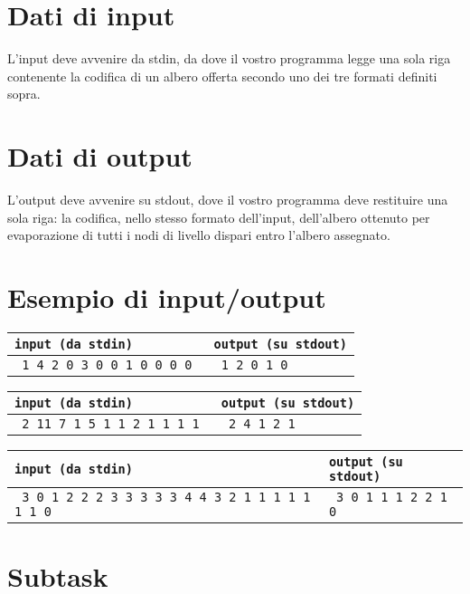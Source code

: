 \documentclass[a4paper,11pt]{article}
\newcommand{\file}[1]{\texttt{#1}}
\newcommand{\esempioB}[2]{
\noindent\begin{minipage}{\textwidth}
\begin{tabular}{|p{9cm}|p{7cm}|}
	\hline
      \textbf{\file{input (da stdin)}} & \textbf{\file{output (su stdout)}}\\
	\hline
	\tt \small #1 &
	\tt \small #2 \\
	\hline
\end{tabular}
\end{minipage}
}
\begin{document}
\section*{Dati di input}

L'input deve avvenire da stdin, da dove il vostro programma legge una sola riga contenente la codifica di un albero offerta secondo uno dei tre formati definiti sopra.

\section*{Dati di output}

L'output deve avvenire su stdout, dove il vostro programma deve restituire una sola riga:
la codifica, nello stesso formato dell'input, dell'albero ottenuto per evaporazione di tutti i nodi di livello dispari entro l'albero assegnato.

\section*{Esempio di input/output}

\esempioB{
1 4 2 0 3 0 0 1 0 0 0 0
}{
1 2 0 1 0  
}

\medskip
\bigskip
\esempioB{
2 11 7 1 5 1 1 2 1 1 1 1
}{
2 4 1 2 1
}

\medskip
\bigskip
\esempioB{
3 0 1 2 2 2 3 3 3 3 3 4 4 3 2 1 1 1 1 1 1 1 0
}{
3 0 1 1 1 2 2 1 0
}


\section*{Subtask}
\end{document}

